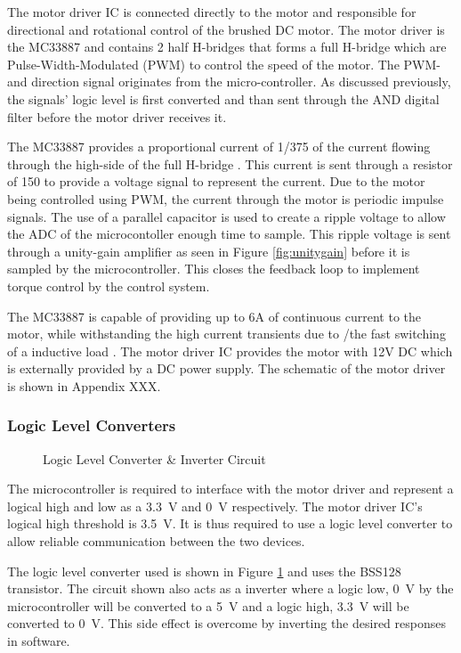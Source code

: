 The motor driver IC is connected directly to the motor and responsible for directional and rotational control of the brushed DC motor. The motor driver is the MC33887 and contains 2 half H-bridges that forms a full H-bridge which are Pulse-Width-Modulated (PWM) to control the speed of the motor. The PWM- and direction signal originates from the micro-controller. As discussed previously, the signals' logic level is first converted and than sent through the AND digital filter before the motor driver receives it.

The MC33887 provides a proportional current of 1/375 of the current flowing through the high-side of the full H-bridge \citep{motorIC}. This current is sent through a resistor of \SI{150}{\Omega} to provide a voltage signal to represent the current. Due to the motor being controlled using PWM, the current through the motor is periodic impulse signals. The use of a parallel capacitor is used to create a ripple voltage to allow the ADC of the microcontoller enough time to sample. This ripple voltage is sent through a unity-gain amplifier as seen in Figure \ref{fig:unitygain} before it is sampled by the microcontroller. This closes the feedback loop to implement torque control by the control system.

The MC33887 is capable of providing up to 6A of continuous current to the motor, while withstanding the high current transients due to /the fast switching of a inductive load \citep{motorIC}. The motor driver IC provides the motor with 12V DC which is externally provided by a DC power supply. The schematic of the motor driver is shown in Appendix XXX.

\subsubsection{Logic Level Converters}
\begin{figure}[h]
	\centering
	
	\caption{Logic Level Converter \& Inverter Circuit}
	\label{fig:interterCirc}
\end{figure}


The microcontroller is required to interface with the motor driver and represent a logical high and low as a \SI{3.3}{V} and \SI{0}{V} respectively. The motor driver IC's logical high threshold is \SI{3.5}{V}. It is thus required to use a logic level converter to allow reliable communication between the two devices.

The logic level converter used is shown in Figure \ref{fig:interterCirc} and uses the BSS128 transistor. The circuit shown also acts as a inverter where a logic low, \SI{0}{V} by the microcontroller will be converted to a \SI{5}{V} and a logic high, \SI{3.3}{V} will be converted to \SI{0}{V}. This side effect is overcome by inverting the desired responses in software.



